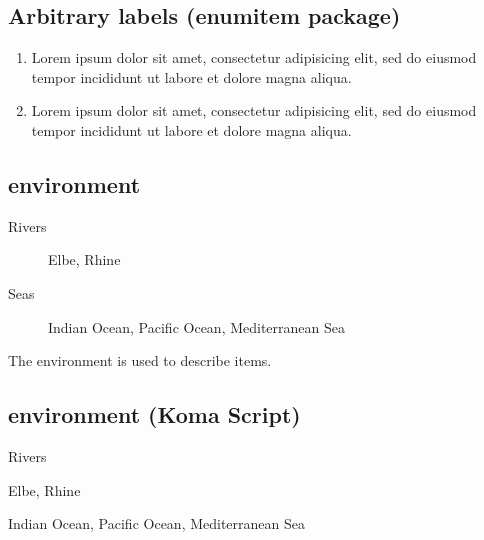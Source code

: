 \subsection{Arbitrary labels (enumitem package)}

\begin{filecontents*}{\democodefile}
\begin{enumerate}[label=(\alph{enumi})]
  \item Lorem ipsum dolor sit amet, consectetur adipisicing elit, sed do eiusmod tempor incididunt ut labore et dolore magna aliqua.
  \item Lorem ipsum dolor sit amet, consectetur adipisicing elit, sed do eiusmod tempor incididunt ut labore et dolore magna aliqua.
\end{enumerate}
\end{filecontents*}

%

\subsection{ environment}
%
\begin{filecontents*}{\democodefile}
\begin{description}
  \item[Rivers] Elbe, Rhine
  \item[Seas]  Indian Ocean, Pacific Ocean, Mediterranean Sea
\end{description}
\end{filecontents*}


The  environment is used to describe items.


\subsection{ environment (Koma Script)}

\begin{filecontents*}{\democodefile}
\begin{labeling}[ --]{Rivers}
  \item[Rivers] Elbe, Rhine
  \item[Seas]  Indian Ocean, Pacific Ocean,  Mediterranean Sea
\end{labeling}
\end{filecontents*}


